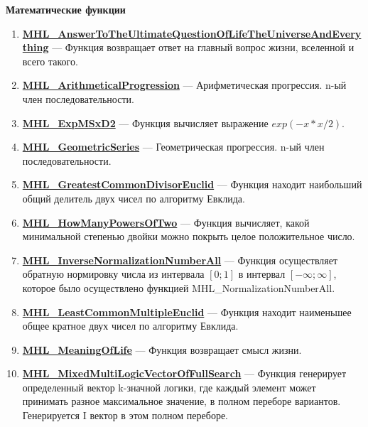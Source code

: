 \documentclass[a4paper,12pt]{article}
\begin{document}
\textbf{Математические функции}
\begin{enumerate}

\item \textbf{\hyperref[MHL_AnswerToTheUltimateQuestionOfLifeTheUniverseAndEverything]{MHL\_AnswerToTheUltimateQuestionOfLifeTheUniverseAndEverything}} --- Функция возвращает ответ на главный вопрос жизни, вселенной и всего такого.

\item \textbf{\hyperref[MHL_ArithmeticalProgression]{MHL\_ArithmeticalProgression}} --- Арифметическая прогрессия. n-ый член последовательности.

\item \textbf{\hyperref[MHL_ExpMSxD2]{MHL\_ExpMSxD2}} --- Функция вычисляет выражение $exp(-x*x/2)$.

\item \textbf{\hyperref[MHL_GeometricSeries]{MHL\_GeometricSeries}} --- Геометрическая прогрессия. n-ый член последовательности.

\item \textbf{\hyperref[MHL_GreatestCommonDivisorEuclid]{MHL\_GreatestCommonDivisorEuclid}} --- Функция находит наибольший общий делитель двух чисел по алгоритму Евклида.

\item \textbf{\hyperref[MHL_HowManyPowersOfTwo]{MHL\_HowManyPowersOfTwo}} --- Функция вычисляет, какой минимальной степенью двойки можно покрыть целое положительное число.

\item \textbf{\hyperref[MHL_InverseNormalizationNumberAll]{MHL\_InverseNormalizationNumberAll}} --- Функция осуществляет обратную нормировку числа из интервала $\left[0;1\right] $  в интервал $\left[-\infty;\infty \right] $, которое было осуществлено функцией MHL\_NormalizationNumberAll.

\item \textbf{\hyperref[MHL_LeastCommonMultipleEuclid]{MHL\_LeastCommonMultipleEuclid}} --- Функция находит наименьшее общее кратное двух чисел по алгоритму Евклида.

\item \textbf{\hyperref[MHL_MeaningOfLife]{MHL\_MeaningOfLife}} --- Функция возвращает смысл жизни.

\item \textbf{\hyperref[MHL_MixedMultiLogicVectorOfFullSearch]{MHL\_MixedMultiLogicVectorOfFullSearch}} --- Функция генерирует определенный вектор k-значной логики, где каждый элемент может принимать разное максимальное значение, в полном переборе вариантов. Генерируется I вектор в этом полном переборе.


\end{enumerate}
\end{document}
